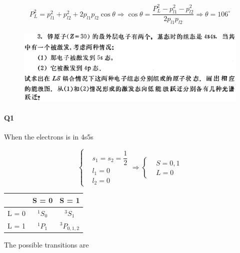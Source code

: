 \documentclass{article}
\begin{document}
\begin{equation*}
  \begin{aligned}
    P_L^2 = p_{l1}^2 + p_{l2}^2 + 2 p_{l1} p_{l2} \cos \theta \Rightarrow \cos \theta = \dfrac{P_L^2 - p_{l1}^2 - p_{l2}^2}{2 p_{l1} p_{l2}} \Rightarrow \theta = 106^{\circ}
  \end{aligned}
\end{equation*}

\begin{figure}[H]
  \centering
  \includegraphics[width=\linewidth]{figures/Problem3}
  \label{fig:}
\end{figure}

\paragraph{Q1}

When the electrons is in 4s5s

\begin{equation*}
  \left\{
    \begin{aligned}
      & s_1 = s_2 = \dfrac{1}{2} \\
      & l_1 = 0 \\
      & l_2 = 0
    \end{aligned}
  \right.
  \Rightarrow
 \left\{
    \begin{aligned}
      & S = 0,1 \\
      & L = 0
    \end{aligned}
  \right.
\end{equation*}


\begin{center}
\begin{tabular}{ c|cc } 
        & S = 0 & S = 1 \\
  \hline
  L = 0 & ${}^{1}S_{0}$ & ${}^{3}S_{1}$ \\
  L = 1 & ${}^{1}P_{1}$ & ${}^{3}P_{0,1,2}$ 
\end{tabular}
\end{center}

The possible transitions are
\end{document}
